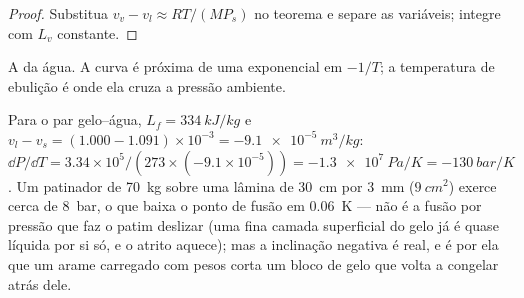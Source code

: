 \begin{proof}
Substitua $v_v - v_l \approx RT/(MP_s)$ no teorema e separe as
variáveis; integre com $L_v$ constante.
\end{proof}

\begin{omfigure}

{\small A  da água. A curva é próxima de uma
exponencial em $-1/T$; a temperatura de ebulição é onde ela cruza a
pressão ambiente.}
\end{omfigure}

\begin{example}\label{ex:b1:phase-changes:skate}
Para o par gelo--água, $L_f = \qty{334}{kJ/kg}$ e $v_l - v_s = (1.000 - 1.091)
\times 10^{-3} = \qty{-9.1e-5}{m^3/kg}$: $\dd P/\dd T = 3.34 \times 10^5/(273 \times
(-9.1 \times 10^{-5})) = \qty{-1.3e7}{Pa/K} = \qty{-130}{bar/K}$. Um patinador de \qty{70}{kg}
sobre uma lâmina de \qty{30}{cm} por \qty{3}{mm} ($\qty{9}{cm^2}$) exerce
cerca de \qty{8}{bar}, o que baixa o ponto de fusão em \qty{0.06}{K} --- não é a fusão por pressão que faz o patim deslizar (uma
fina camada superficial do gelo já é quase líquida por si só, e o atrito
aquece); mas a inclinação negativa é real, e é por ela que um arame
carregado com pesos corta um bloco de gelo que volta a congelar atrás dele.
\end{example}

